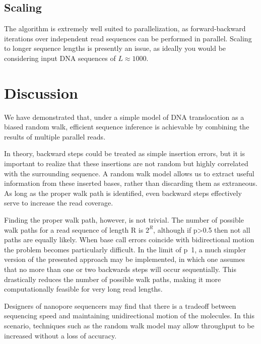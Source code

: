 \documentclass[12pt]{article}
\begin{document}
\subsection{Scaling}
The algorithm is extremely well suited to parallelization, as forward-backward iterations over independent read sequences can be performed in parallel.
Scaling to longer sequence lengths is presently an issue, as ideally you would be considering input DNA sequences of $L\approx1000$.


\section{Discussion}
We have demonstrated that, under a simple model of DNA translocation as a biased random walk, efficient sequence inference is achievable by combining the results of multiple parallel reads.

In theory, backward steps could be treated as simple insertion errors, but it is important to realize that these insertions are not random but highly correlated with the surrounding sequence.
A random walk model allows us to extract useful information from these inserted bases, rather than discarding them as extraneous.
As long as the proper walk path is identified, even backward steps effectively serve to increase the read coverage.

Finding the proper walk path, however, is not trivial.
The number of possible walk paths for a read sequence of length R is $2^R$, although if p>0.5 then not all paths are equally likely.
When base call errors coincide with bidirectional motion the problem becomes particularly difficult.
In the limit of p~1, a much simpler version of the presented approach may be implemented, in which one assumes that no more than one or two backwards steps will occur sequentially.
This drastically reduces the number of possible walk paths, making it more computationally feasible for very long read lengths.

Designers of nanopore sequencers may find that there is a tradeoff between sequencing speed and maintaining unidirectional motion of the molecules.
In this scenario, techniques such as the random walk model may allow throughput to be increased without a loss of accuracy.





\end{document}
